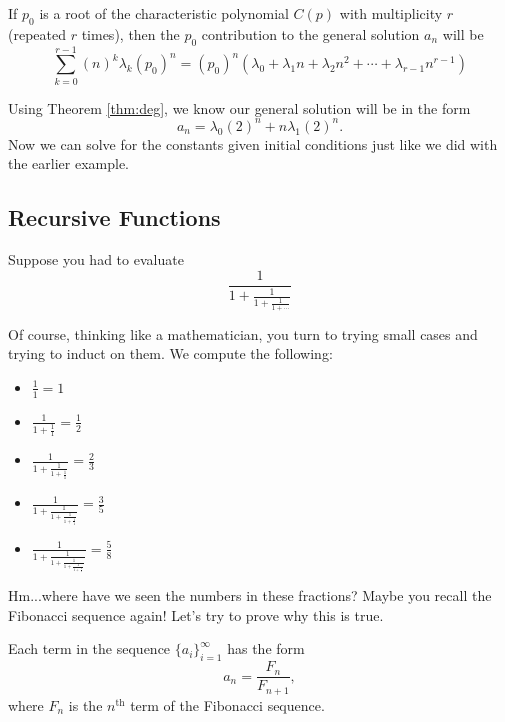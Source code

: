\begin{theorem}
If $p_0$ is a root of the characteristic polynomial $C(p)$ with multiplicity $r$ (repeated $r$ times), then the $p_0$ contribution to the general solution $a_n$ will be
\begin{equation}
    \sum\limits_{k=0}^{r-1} (n)^{k} \lambda_k (p_0)^n = (p_0)^n\left(\lambda_0 + \lambda_1 n +\lambda_2 n^2 + \cdots +\lambda_{r-1} n^{r-1}\right)
\end{equation}
\label{thm:deg}
\end{theorem}

Using Theorem \ref{thm:deg}, we know our general solution will be in the form 
\begin{equation}
    a_n = \lambda_0 (2)^n + n\lambda_1 (2)^n.
\end{equation}
Now we can solve for the constants given initial conditions just like we did with the earlier example.

\subsection{Recursive Functions}
Suppose you had to evaluate
\begin{equation}
    \frac{1}{1+\frac{1}{1+\frac{1}{1+\cdots}}}
\end{equation}

Of course, thinking like a mathematician, you turn to trying small cases and trying to induct on them. We compute the following:

\begin{itemize}
    \item $\frac{1}{1} = 1$
    \item $\frac{1}{1+\frac{1}{1}} = \frac{1}{2}$
    \item $\frac{1}{1+\frac{1}{1+\frac{1}{1}}} = \frac{2}{3}$
    \item $\frac{1}{1+\frac{1}{1+\frac{1}{1+\frac{1}{1}}}} = \frac{3}{5}$
    \item $\frac{1}{1+\frac{1}{1+\frac{1}{1+\frac{1}{1+\frac{1}{1}}}}} = \frac{5}{8}$
\end{itemize}

Hm...where have we seen the numbers in these fractions? Maybe you recall the Fibonacci sequence again! Let's try to prove why this is true. 

\begin{lemma}
Each term in the sequence $\{a_i\}_{i=1}^{\infty}$ has the form
\begin{equation}
    a_n = \frac{F_{n}}{F_{n+1}},
\end{equation}
where $F_n$ is the $n^{\text{th}}$ term of the Fibonacci sequence.
\label{lm:1}
\end{lemma}

